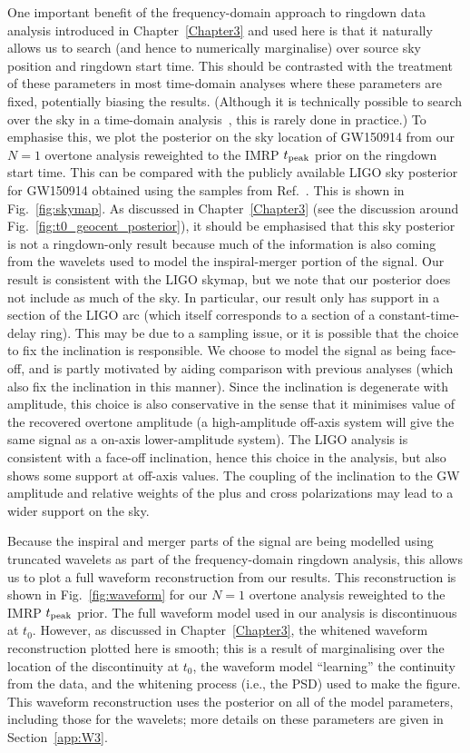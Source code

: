 One important benefit of the frequency-domain approach to ringdown data analysis introduced in Chapter~\ref{Chapter3} and used here is that it naturally allows us to search (and hence to numerically marginalise) over source sky position and ringdown start time. 
This should be contrasted with the treatment of these parameters in most time-domain analyses where these parameters are fixed, potentially biasing the results. (Although it is technically possible to search over the sky in a time-domain analysis~\cite{Carullo:2019flw, Isi:2021iql}, this is rarely done in practice.)
To emphasise this, we plot the posterior on the sky location of GW150914 from our $N=1$ overtone analysis reweighted to the IMRP $t_{\rm peak}$ prior on the ringdown start time.
This can be compared with the publicly available LIGO sky posterior for GW150914 obtained using the samples from Ref.~\cite{skysamples}.
This is shown in Fig.~\ref{fig:skymap}.
As discussed in Chapter~\ref{Chapter3} (see the discussion around Fig.~\ref{fig:t0_geocent_posterior}), it should be emphasised that this sky posterior is not a ringdown-only result because much of the information is also coming from the wavelets used to model the inspiral-merger portion of the signal.
Our result is consistent with the LIGO skymap, but we note that our posterior does not include as much of the sky.
In particular, our result only has support in a section of the LIGO arc (which itself corresponds to a section of a constant-time-delay ring).
This may be due to a sampling issue, or it is possible that the choice to fix the inclination is responsible. 
We choose to model the signal as being face-off, and is partly motivated by aiding comparison with previous analyses (which also fix the inclination in this manner). 
Since the inclination is degenerate with amplitude, this choice is also conservative in the sense that it minimises value of the recovered overtone amplitude (a high-amplitude off-axis system will give the same signal as a on-axis lower-amplitude system).
The LIGO analysis is consistent with a face-off inclination, hence this choice in the analysis, but also shows some support at off-axis values.
The coupling of the inclination to the GW amplitude and relative weights of the plus and cross polarizations may lead to a wider support on the sky.

Because the inspiral and merger parts of the signal are being modelled using truncated wavelets as part of the frequency-domain ringdown analysis, this allows us to plot a full waveform reconstruction from our results.
This reconstruction is shown in Fig.~\ref{fig:waveform} for our $N=1$ overtone analysis reweighted to the IMRP $t_{\rm peak}$ prior.
The full waveform model used in our analysis is discontinuous at $t_0$. However, as discussed in Chapter~\ref{Chapter3}, the whitened waveform reconstruction plotted here is smooth; this is a result of marginalising over the location of the discontinuity at $t_0$, the waveform model ``learning'' the continuity from the data, and the whitening process (i.e., the PSD) used to make the figure.
This waveform reconstruction uses the posterior on all of the model parameters, including those for the wavelets; more details on these parameters are given in Section~\ref{app:W3}.


